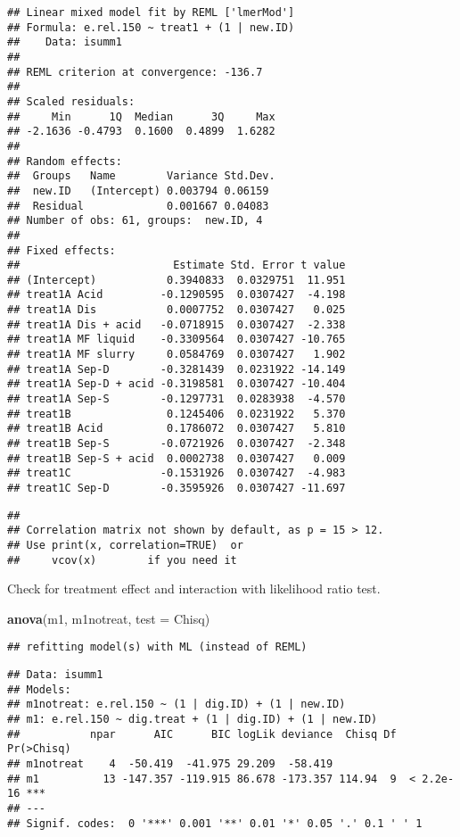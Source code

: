 \documentclass[
]{article}
\newenvironment{Shaded}{\begin{snugshade}}{\end{snugshade}}
\newcommand{\AttributeTok}[1]{\textcolor[rgb]{0.13,0.29,0.53}{#1}}
\newcommand{\FunctionTok}[1]{\textcolor[rgb]{0.13,0.29,0.53}{\textbf{#1}}}
\newcommand{\NormalTok}[1]{#1}
\newcommand{\StringTok}[1]{\textcolor[rgb]{0.31,0.60,0.02}{#1}}
\begin{document}
\begin{verbatim}
## Linear mixed model fit by REML ['lmerMod']
## Formula: e.rel.150 ~ treat1 + (1 | new.ID)
##    Data: isumm1
## 
## REML criterion at convergence: -136.7
## 
## Scaled residuals: 
##     Min      1Q  Median      3Q     Max 
## -2.1636 -0.4793  0.1600  0.4899  1.6282 
## 
## Random effects:
##  Groups   Name        Variance Std.Dev.
##  new.ID   (Intercept) 0.003794 0.06159 
##  Residual             0.001667 0.04083 
## Number of obs: 61, groups:  new.ID, 4
## 
## Fixed effects:
##                        Estimate Std. Error t value
## (Intercept)           0.3940833  0.0329751  11.951
## treat1A Acid         -0.1290595  0.0307427  -4.198
## treat1A Dis           0.0007752  0.0307427   0.025
## treat1A Dis + acid   -0.0718915  0.0307427  -2.338
## treat1A MF liquid    -0.3309564  0.0307427 -10.765
## treat1A MF slurry     0.0584769  0.0307427   1.902
## treat1A Sep-D        -0.3281439  0.0231922 -14.149
## treat1A Sep-D + acid -0.3198581  0.0307427 -10.404
## treat1A Sep-S        -0.1297731  0.0283938  -4.570
## treat1B               0.1245406  0.0231922   5.370
## treat1B Acid          0.1786072  0.0307427   5.810
## treat1B Sep-S        -0.0721926  0.0307427  -2.348
## treat1B Sep-S + acid  0.0002738  0.0307427   0.009
## treat1C              -0.1531926  0.0307427  -4.983
## treat1C Sep-D        -0.3595926  0.0307427 -11.697
\end{verbatim}

\begin{verbatim}
## 
## Correlation matrix not shown by default, as p = 15 > 12.
## Use print(x, correlation=TRUE)  or
##     vcov(x)        if you need it
\end{verbatim}

Check for treatment effect and interaction with likelihood ratio test.

\begin{Shaded}
\begin{Highlighting}[]
\FunctionTok{anova}\NormalTok{(m1, m1notreat, }\AttributeTok{test =} \StringTok{\textquotesingle{}Chisq\textquotesingle{}}\NormalTok{)}
\end{Highlighting}
\end{Shaded}

\begin{verbatim}
## refitting model(s) with ML (instead of REML)
\end{verbatim}

\begin{verbatim}
## Data: isumm1
## Models:
## m1notreat: e.rel.150 ~ (1 | dig.ID) + (1 | new.ID)
## m1: e.rel.150 ~ dig.treat + (1 | dig.ID) + (1 | new.ID)
##           npar      AIC      BIC logLik deviance  Chisq Df Pr(>Chisq)    
## m1notreat    4  -50.419  -41.975 29.209  -58.419                         
## m1          13 -147.357 -119.915 86.678 -173.357 114.94  9  < 2.2e-16 ***
## ---
## Signif. codes:  0 '***' 0.001 '**' 0.01 '*' 0.05 '.' 0.1 ' ' 1
\end{verbatim}
\end{document}
